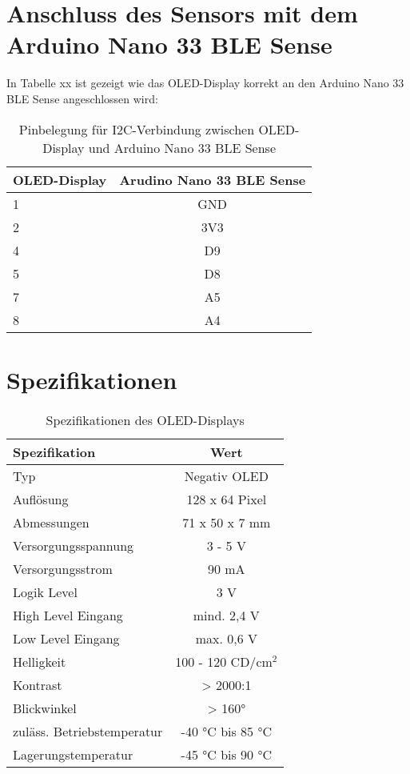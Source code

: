 \section{Anschluss des Sensors mit dem Arduino Nano 33 BLE Sense}

In Tabelle xx ist gezeigt wie das OLED-Display korrekt an den Arduino Nano 33 BLE Sense angeschlossen wird:

\begin{table}[htpb]
	\centering
	\begin{tabular}{|l|c|}
		\hline
		\textbf{OLED-Display} & \textbf{Arudino Nano 33 BLE Sense} \\
		\hline
		1 & GND \\
		2 & 3V3 \\
		4 & D9 \\
		5 & D8 \\
		7 & A5 \\
		8 & A4 \\
		\hline
	\end{tabular}
	\caption{Pinbelegung für I2C-Verbindung zwischen OLED-Display und Arduino Nano 33 BLE Sense}
	\label{tab:PinOLED}
\end{table}

\section{Spezifikationen}

\begin{table}[htpb]
	\centering
	\begin{tabular}{|l|c|}
		\hline
		\textbf{Spezifikation} & \textbf{Wert} \\
		\hline
		Typ & Negativ OLED \\
		Auflösung & 128 x 64 Pixel \\
		Abmessungen & 71 x 50 x 7 mm \\
		Versorgungsspannung & 3 - 5 V \\
		Versorgungsstrom & 90 mA \\
		Logik Level & 3 V \\
		High Level Eingang & mind. 2,4 V \\
		Low Level Eingang & max. 0,6 V \\
		Helligkeit & 100 - 120 CD/$\mathrm{cm^2}$ \\
		Kontrast & > 2000:1 \\
		Blickwinkel & > 160° \\
		zuläss. Betriebstemperatur & -40 °C bis 85 °C \\
		Lagerungstemperatur & -45 °C bis 90 °C \\
		\hline
	\end{tabular}
	\caption{Spezifikationen des OLED-Displays}
	\label{tab:SpezifikationOLED}
\end{table}

